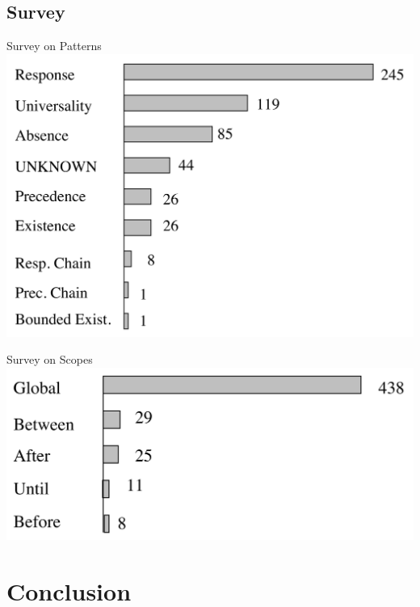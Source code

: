 \subsection{Survey}

\begin{Frame}{Survey on Patterns}
  \includegraphics[width=\textwidth]{content/chapter_rv/dwyer-survey-patterns}
\end{Frame}

\begin{Frame}{Survey on Scopes}
  \includegraphics[width=\textwidth]{content/chapter_rv/dwyer-survey-scopes}
\end{Frame}

\section*{Conclusion}

